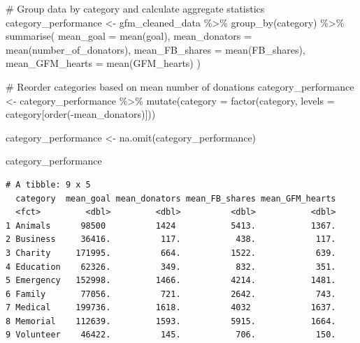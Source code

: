 \documentclass[
  letterpaper,
  DIV=11,
  numbers=noendperiod]{scrartcl}
\newenvironment{Shaded}{\begin{snugshade}}{\end{snugshade}}
\newcommand{\AttributeTok}[1]{\textcolor[rgb]{0.40,0.45,0.13}{#1}}
\newcommand{\CommentTok}[1]{\textcolor[rgb]{0.37,0.37,0.37}{#1}}
\newcommand{\FunctionTok}[1]{\textcolor[rgb]{0.28,0.35,0.67}{#1}}
\newcommand{\NormalTok}[1]{\textcolor[rgb]{0.00,0.23,0.31}{#1}}
\newcommand{\OtherTok}[1]{\textcolor[rgb]{0.00,0.23,0.31}{#1}}
\newcommand{\SpecialCharTok}[1]{\textcolor[rgb]{0.37,0.37,0.37}{#1}}
\begin{document}
\begin{Shaded}
\begin{Highlighting}[]
\CommentTok{\# Group data by category and calculate aggregate statistics}
\NormalTok{category\_performance }\OtherTok{\textless{}{-}}\NormalTok{ gfm\_cleaned\_data }\SpecialCharTok{\%\textgreater{}\%}
  \FunctionTok{group\_by}\NormalTok{(category) }\SpecialCharTok{\%\textgreater{}\%}
  \FunctionTok{summarise}\NormalTok{(}
    \AttributeTok{mean\_goal =} \FunctionTok{mean}\NormalTok{(goal),}
    \AttributeTok{mean\_donators =} \FunctionTok{mean}\NormalTok{(number\_of\_donators),}
    \AttributeTok{mean\_FB\_shares =} \FunctionTok{mean}\NormalTok{(FB\_shares),}
    \AttributeTok{mean\_GFM\_hearts =} \FunctionTok{mean}\NormalTok{(GFM\_hearts)}
\NormalTok{  ) }

\CommentTok{\# Reorder categories based on mean number of donations}
\NormalTok{category\_performance }\OtherTok{\textless{}{-}}\NormalTok{ category\_performance }\SpecialCharTok{\%\textgreater{}\%}
  \FunctionTok{mutate}\NormalTok{(}\AttributeTok{category =} \FunctionTok{factor}\NormalTok{(category, }\AttributeTok{levels =}\NormalTok{ category[}\FunctionTok{order}\NormalTok{(}\SpecialCharTok{{-}}\NormalTok{mean\_donators)]))}

\NormalTok{category\_performance }\OtherTok{\textless{}{-}} \FunctionTok{na.omit}\NormalTok{(category\_performance)}

\NormalTok{category\_performance }
\end{Highlighting}
\end{Shaded}

\begin{verbatim}
# A tibble: 9 x 5
  category  mean_goal mean_donators mean_FB_shares mean_GFM_hearts
  <fct>         <dbl>         <dbl>          <dbl>           <dbl>
1 Animals      98500          1424           5413.           1367.
2 Business     36416.          117.           438.            117.
3 Charity     171995.          664.          1522.            639.
4 Education    62326.          349.           832.            351.
5 Emergency   152998.         1466.          4214.           1481.
6 Family       77056.          721.          2642.            743.
7 Medical     199736.         1618.          4032            1637.
8 Memorial    112639.         1593.          5915.           1664.
9 Volunteer    46422.          145.           706.            150.
\end{verbatim}
\end{document}
